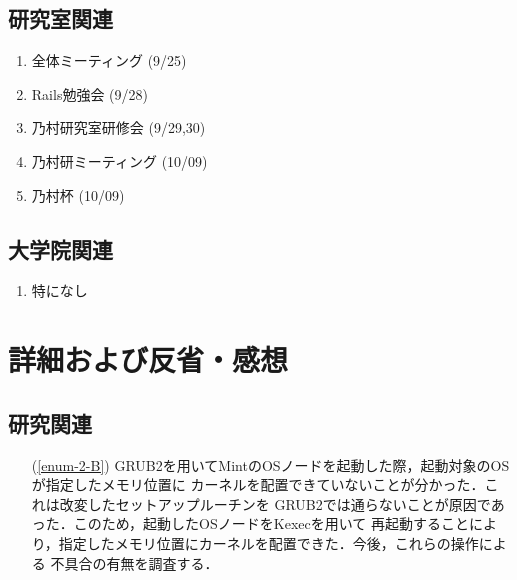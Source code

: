 \documentclass[fleqn, 14pt]{extarticle}
\begin{document}
    \subsection{研究室関連}
    \label{sec-2-2}
    \begin{enumerate}

        \item 全体ミーティング
            \hfill
            \label{enum-lab1}
            (9/25)

        \item Rails勉強会
            \hfill
            \label{enum-lab1}
            (9/28)

        \item 乃村研究室研修会
            \hfill
            \label{enum-lab1}
            (9/29,30)

        \item 乃村研ミーティング
            \hfill
            \label{enum-lab1}
            (10/09)

        \item 乃村杯
            \hfill
            \label{enum-lab1}
            (10/09)

    \end{enumerate}

    \subsection{大学院関連}
    \label{sec2-3}
    \begin{enumerate}

        \item 特になし
            \hfill
            \label{enum-univ1}

    \end{enumerate}

    \section{詳細および反省・感想}
    \label{sec-3}

    \subsection{研究関連}
    \label{sec-3-2}

    \begin{itemize}

        \item[(\ref{enum-2-B})]
            GRUB2を用いてMintのOSノードを起動した際，起動対象のOSが指定したメモリ位置に
            カーネルを配置できていないことが分かった．これは改変したセットアップルーチンを
            GRUB2では通らないことが原因であった．このため，起動したOSノードをKexecを用いて
            再起動することにより，指定したメモリ位置にカーネルを配置できた．今後，これらの操作による
            不具合の有無を調査する．

    \end{itemize}
\end{document}
